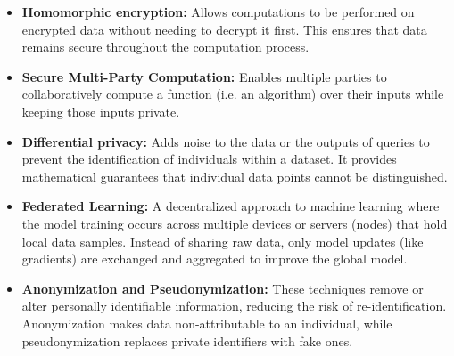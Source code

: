 \begin{itemize}
    \item \textbf{Homomorphic encryption:} Allows computations to be performed on encrypted data without needing to decrypt it first. This ensures that data remains secure throughout the computation process.
    \item \textbf{Secure Multi-Party Computation:} Enables multiple parties to collaboratively compute a function (i.e. an algorithm) over their inputs while keeping those inputs private.
    \item \textbf{Differential privacy:} Adds noise to the data or the outputs of queries to prevent the identification of individuals within a dataset. It provides mathematical guarantees that individual data points cannot be distinguished.
    \item \textbf{Federated Learning:} A decentralized approach to machine learning where the model training occurs across multiple devices or servers (nodes) that hold local data samples. Instead of sharing raw data, only model updates (like gradients) are exchanged and aggregated to improve the global model.
    \item \textbf{Anonymization and Pseudonymization:} These techniques remove or alter personally identifiable information, reducing the risk of re-identification. Anonymization makes data non-attributable to an individual, while pseudonymization replaces private identifiers with fake ones.
\end{itemize}



